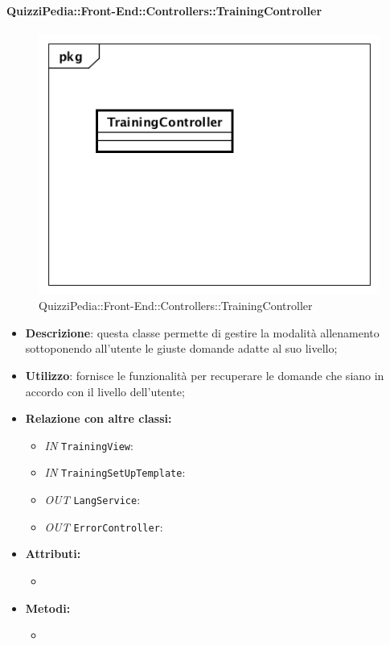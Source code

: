 \paragraph{QuizziPedia::Front-End::Controllers::TrainingController}
\begin{figure}
	\centering
	\includegraphics[scale=0.45]{UML/Classi/Front-End/QuizziPedia_Front-end_Controller_TrainingController.png}
	\caption{QuizziPedia::Front-End::Controllers::TrainingController}
\end{figure}
\begin{itemize}
	\item \textbf{Descrizione}: questa classe permette di gestire la modalità allenamento sottoponendo all'utente le giuste domande adatte al suo livello;
	\item \textbf{Utilizzo}: fornisce le funzionalità per recuperare le domande che siano in accordo con il livello dell'utente;
	\item \textbf{Relazione con altre classi:}
	\begin{itemize}
		\item \textit{IN} \texttt{TrainingView}: 
		\item \textit{IN} \texttt{TrainingSetUpTemplate}:
		\item \textit{OUT} \texttt{LangService}:  
		\item \textit{OUT} \texttt{ErrorController}: 
	\end{itemize}
	\item \textbf{Attributi:}
	\begin{itemize}
		\item 
	\end{itemize}
	\item \textbf{Metodi:}
	\begin{itemize}
		\item 
	\end{itemize}
\end{itemize}

